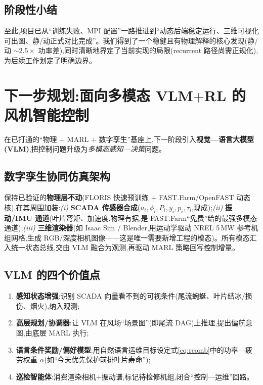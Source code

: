 \documentclass[12pt,a4paper]{article}
\theoremstyle{definition}
\theoremstyle{plain}
\begin{document}
\subsection{阶段性小结}

至此,项目已从“训练失败、MPI 配置”一路推进到“动态后端稳定运行、三维可视化可出图、静/动正式对比完成”。我们得到了一个稳健且有物理解释的核心发现(静/动 $\sim\!2.5\times$ 功率差),同时清晰地界定了当前实现的局限(recurrent 路径尚需正规化),为后续工作划定了明确边界。

\section{下一步规划:面向多模态 VLM$+$RL 的风机智能控制}
\label{sec:future}

在已打通的“物理 $+$ MARL $+$ 数字孪生”基座上,下一阶段引入\textbf{视觉—语言大模型(VLM)},把控制问题升级为\emph{多模态感知—决策}问题。

\subsection{数字孪生协同仿真架构}

保持已验证的\textbf{物理层不动}(FLORIS 快速预训练 $+$ FAST.Farm/OpenFAST 动态核),在其周围加装:\emph{(i)} \textbf{SCADA 传感器合成}($u_i,\phi_i,P_i,y_i,p_i,\tau_i$,现成);\emph{(ii)} \textbf{振动/IMU 通道}(叶片弯矩、加速度,物理有据,是 FAST.Farm“免费”给的最强多模态通道);\emph{(iii)} \textbf{三维渲染器}(如 Isaac Sim / Blender,用运动学驱动 NREL 5\,MW 参考机组网格,生成 RGB/深度相机图像——这是唯一需要新增工程的模态)。所有模态汇入统一状态总线,交由 VLM 融合为观测,再驱动 MARL 策略回写控制增量。

\subsection{VLM 的四个价值点}

\begin{enumerate}[leftmargin=1.6em,itemsep=1pt]
  \item \textbf{感知状态增强}:识别 SCADA 向量看不到的可视条件(尾流蜿蜒、叶片结冰/损伤、烟火),纳入观测;
  \item \textbf{高层规划/协调器}:让 VLM 在风场“场景图”(即尾流 DAG)上推理,提出偏航意图,由底层 MARL 执行;
  \item \textbf{语言条件奖励/偏好模型}:用自然语言运维目标设定式\eqref{eq:rcomb}中的功率—疲劳权重 $\alpha$(如“今天优先保护前排叶片寿命”);
  \item \textbf{巡检智能体}:消费渲染相机$+$振动谱,标记待检修机组,闭合“控制—运维”回路。
\end{enumerate}
\end{document}
